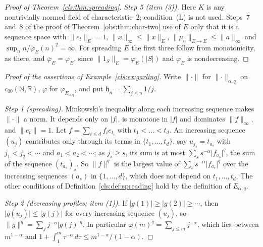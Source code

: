 \documentclass[11pt]{amsart}
\theoremstyle{definition}
\theoremstyle{remark}
\numberwithin{equation}{section}
\newcommand{\N}{\mathbb N}
\newcommand{\abs}[1]{\lvert #1\rvert}
\newcommand{\norm}[1]{\lVert #1\rVert}
\theoremstyle{plain}
\theoremstyle{definition}
\theoremstyle{plain}
\begin{document}
\begin{proof}[Proof of Theorem~\ref{cls:thm:spreading}]
\emph{Step 5 (item (3)).} Here $K$ is any nontrivially normed field of characteristic~$2$; condition~\textup{(L)} is not
used. Steps~7 and~8 of the proof of Theorem~\ref{obs:thm:char-two} use of $E$ only that it is a sequence
space with $\norm{e_t}_E=1$, $\norm x_\infty\le\norm x_E$, $\norm{\mu_a}_{E\to E}\le\norm a_\infty$ and
$\sup_nn/\bar\varphi_E(n)^2=\infty$. For spreading $E$ the first three follow from monotonicity, as there, and
$\bar\varphi_E=\varphi_E$, since $\norm{1_S}_E=\varphi_E(\abs S)$ and $\varphi_E$ is nondecreasing.
\end{proof}

\begin{proof}[Proof of the assertions of Example~\ref{cls:ex:garling}]
Write $\norm\cdot$ for $\norm\cdot_{\alpha,q}$ on $c_{00}(\N,\mathbb R)$, $\varphi$ for $\varphi_{E_{\alpha,q}}$, and put
$\mathfrak h_n=\sum_{j\le n}1/j$.

\emph{Step 1 (spreading).} Minkowski's inequality along each increasing sequence makes $\norm\cdot$ a norm. It depends
only on $\abs f$, is monotone in $\abs f$ and dominates $\norm f_\infty$, and $\norm{e_t}=1$. Let
$f=\sum_{i\le d}f_ie_{t_i}$ with $t_1<\dots<t_d$. An increasing sequence $(u_j)$ contributes only through its terms in
$\{t_1,\dots,t_d\}$, say $u_{j_s}=t_{a_s}$ with $j_1<j_2<\cdots$ and $a_1<a_2<\cdots$; as $j_s\ge s$, its sum is at most
$\sum_ss^{-\alpha}\abs{f_{a_s}}^q$, the sum of the sequence $(t_{a_s})_s$. So $\norm f^q$ is the largest value of
$\sum_ss^{-\alpha}\abs{f_{a_s}}^q$ over the increasing sequences $(a_s)$ in $\{1,\dots,d\}$, which does not depend on
$t_1,\dots,t_d$. The other conditions of Definition~\ref{cls:def:spreading} hold by the definition of $E_{\alpha,q}$.

\emph{Step 2 (decreasing profiles; item (1)).} If $\abs{g(1)}\ge\abs{g(2)}\ge\cdots$, then $\abs{g(u_j)}\le\abs{g(j)}$
for every increasing sequence $(u_j)$, so $\norm g^q=\sum_jj^{-\alpha}\abs{g(j)}^q$. In particular
$\varphi(m)^q=\sum_{j\le m}j^{-\alpha}$, which lies between $m^{1-\alpha}$ and
$1+\int_1^m\tau^{-\alpha}\,d\tau\le m^{1-\alpha}/(1-\alpha)$.


\end{proof}
\end{document}

